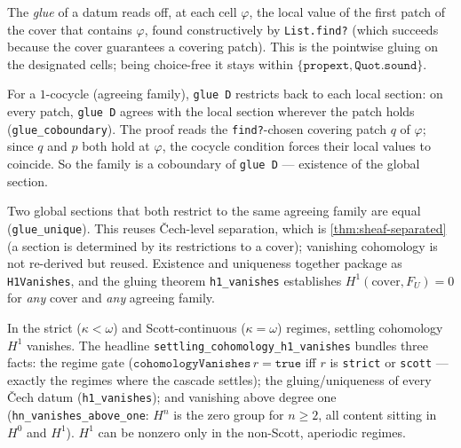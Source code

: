 \begin{proposition}\label{thm:glue}\leanok{}
The \emph{glue} of a datum reads off, at each cell $\varphi$, the local value of the first patch of the cover that contains $\varphi$, found constructively by \texttt{List.find?} (which succeeds because the cover guarantees a covering patch). This is the pointwise gluing on the designated cells; being choice-free it stays within $\{\texttt{propext}, \texttt{Quot.sound}\}$.
\end{proposition}
\begin{theorem}\label{thm:h1-vanishes}\leanok{}
For a $1$-cocycle (agreeing family), \texttt{glue D} restricts back to each local section: on every patch, \texttt{glue D} agrees with the local section wherever the patch holds (\texttt{glue\_coboundary}). The proof reads the \texttt{find?}-chosen covering patch $q$ of $\varphi$; since $q$ and $p$ both hold at $\varphi$, the cocycle condition forces their local values to coincide. So the family is a coboundary of \texttt{glue D} --- existence of the global section.
\end{theorem}
\begin{theorem}\label{thm:classifying-invariant-zero}\leanok{}
Two global sections that both restrict to the same agreeing family are equal (\texttt{glue\_unique}). This reuses \v{C}ech-level separation, which is \cref{thm:sheaf-separated} (a section is determined by its restrictions to a cover); vanishing cohomology is not re-derived but reused. Existence and uniqueness together package as \texttt{H1Vanishes}, and the gluing theorem \texttt{h1\_vanishes} establishes $H^1(\text{cover}, F_U) = 0$ for \emph{any} cover and \emph{any} agreeing family.
\end{theorem}
\begin{theorem}\label{thm:h1-zero-iff-confluent}\leanok{}
In the strict ($\kappa < \omega$) and Scott-continuous ($\kappa = \omega$) regimes, settling cohomology $H^1$ vanishes. The headline \texttt{settling\_cohomology\_h1\_vanishes} bundles three facts: the regime gate ($\texttt{cohomologyVanishes}\,r = \texttt{true}$ iff $r$ is \texttt{strict} or \texttt{scott} --- exactly the regimes where the cascade settles); the gluing/uniqueness of every \v{C}ech datum (\texttt{h1\_vanishes}); and vanishing above degree one (\texttt{hn\_vanishes\_above\_one}: $H^n$ is the zero group for $n \geq 2$, all content sitting in $H^0$ and $H^1$). $H^1$ can be nonzero only in the non-Scott, aperiodic regimes.
\end{theorem}
